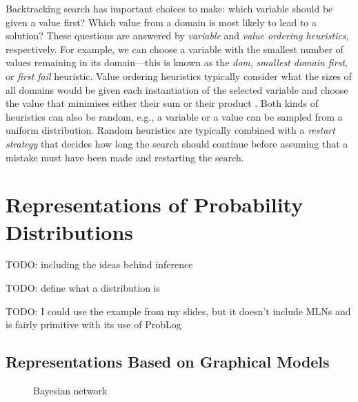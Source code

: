 Backtracking search has important choices to make: which variable should be given a value first? Which value from a domain is most likely to lead to a solution? These questions are answered by \emph{variable} and \emph{value ordering heuristics}, respectively. For example, we can choose a variable with the smallest number of values remaining in its domain---this is known as the \emph{dom}, \emph{smallest domain first}, or \emph{first fail} heuristic. Value ordering heuristics typically consider what the sizes of all domains would be given each instantiation of the selected variable and choose the value that minimises either their sum or their product \citep{DBLP:reference/fai/Beek06}. Both kinds of heuristics can also be random, e.g., a variable or a value can be sampled from a uniform distribution. Random heuristics are typically combined with a \emph{restart strategy} that decides how long the search should continue before assuming that a mistake must have been made and restarting the search.


\section{Representations of Probability Distributions}

TODO: including the ideas behind inference

TODO: define what a distribution is

TODO: I could use the example from my slides, but it doesn't include MLNs and is fairly primitive with its use of ProbLog

\subsection{Representations Based on Graphical Models}

\begin{figure}
  \centering
  \caption{Bayesian network}
  \label{fig:bn}
\end{figure}

